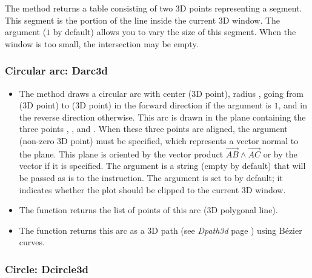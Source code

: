 The  method returns a table consisting of two 3D points representing a segment. This segment is the portion of the line  inside the current 3D window. The  argument ($1$ by default) allows you to vary the size of this segment. When the window is too small, the intersection may be empty.

\subsubsection{Circular arc: Darc3d}

\begin{itemize}
    \item The method  draws a circular arc with center  (3D point), radius , going from  (3D point) to  (3D point) in the forward direction if the argument  is $1$, and in the reverse direction otherwise. This arc is drawn in the plane containing the three points , , and . When these three points are aligned, the argument  (non-zero 3D point) must be specified, which represents a vector normal to the plane. This plane is oriented by the vector product $\vec{AB}\wedge\vec{AC}$ or by the vector  if it is specified. The  argument is a string (empty by default) that will be passed as is to the \drawcmd instruction. The  argument is set to \false by default; it indicates whether the plot should be clipped to the current 3D window.

    \item The  function returns the list of points of this arc (3D polygonal line).

    \item The  function returns this arc as a 3D path (see \emph{Dpath3d} page \pageref{Dpath3d}) using Bézier curves.
\end{itemize}

\subsubsection{Circle: Dcircle3d}

